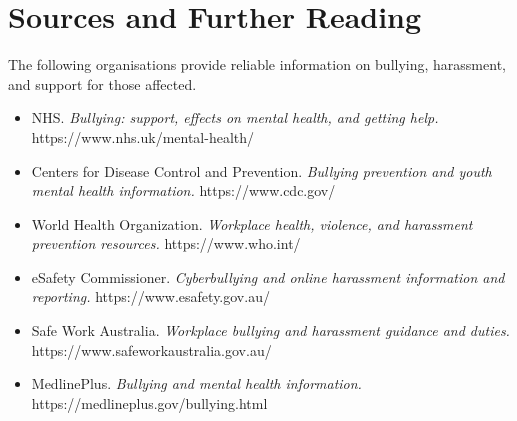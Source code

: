 \section*{Sources and Further Reading}
The following organisations provide reliable information on bullying, harassment, and support for those affected.

\begin{itemize}
    \item NHS. \textit{Bullying: support, effects on mental health, and getting help.} https://www.nhs.uk/mental-health/
    \item Centers for Disease Control and Prevention. \textit{Bullying prevention and youth mental health information.} https://www.cdc.gov/
    \item World Health Organization. \textit{Workplace health, violence, and harassment prevention resources.} https://www.who.int/
    \item eSafety Commissioner. \textit{Cyberbullying and online harassment information and reporting.} https://www.esafety.gov.au/
    \item Safe Work Australia. \textit{Workplace bullying and harassment guidance and duties.} https://www.safeworkaustralia.gov.au/
    \item MedlinePlus. \textit{Bullying and mental health information.} https://medlineplus.gov/bullying.html
\end{itemize}
